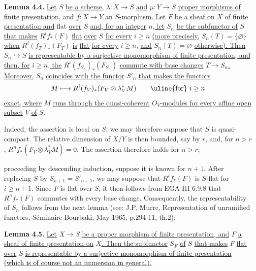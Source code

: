 \textbf{Lemma 4.4.} \uline{Let} \(S\) \uline{be a scheme,} \(\lambda:X\to S\) \uline{and} \(\mu:Y\to S\) \uline{proper morphisms of finite presentation, and} \(f:X\to Y\) \uline{an} \(S\)\uline{-morphism. Let} \(F\) \uline{be a sheaf on} \(X\) \uline{of finite presentation and} flat \uline{over} \(S\) \uline{and, for an integer} \(n\)\uline{, let} \(S_n\) \uline{be the subfunctor of} \(S\) \uline{that makes} \(R^if_*(F)\) \uline{flat} \uline{over} \(S\) \uline{for every} \(i\ge n\) \uline{(more precisely,} \(S_n(T)=\{\varnothing\}\) \uline{when} \(R^i(f_T)_*(F_T)\) \uline{is} \uline{flat} \uline{for every} \(i\ge n\), \uline{and} \(S_n(T)=\varnothing\) \uline{otherwise). Then} \(S_n\hookrightarrow S\) \uline{is representable by a surjective monomorphism of finite presentation, and then, for} \(i\ge n\)\uline{, the} \(R^i(f_{S_n})_*(F_{S_n})\) \uline{commute with base changes} \(T\to S_n\)\uline{. Moreover,} \(S_n\) \uline{coincides with the functor} \(S'_n\) \uline{that makes the functors}
\[
  M\longmapsto R^i(f_V)_*(F_V\otimes\lambda_V^*M)\qquad \text{\uline{for} } i\ge n
\]
\uline{exact, where} \(M\) \uline{runs through the quasi-coherent} \({O}_V\)\uline{-modules for every affine open subset} \(V\) \uline{of} \(S\).

Indeed, the assertion is local on \(S\); we may therefore suppose that \(S\) is quasi-compact. The relative dimension of \(X/Y\) is then bounded, say by \(r\), and, for \(n>r\), \(R^nf_*(F_V\otimes\lambda_V^*M)=0\). The assertion therefore holds for \(n>r\);


%
proceeding by descending induction, suppose it is known for \(n+1\). After replacing \(S\) by \(S_{n+1}=S'_{n+1}\), we may suppose that \(R^if_*(F)\) is \(S\)-flat for \(i\ge n+1\). Since \(F\) is flat over \(S\), it then follows from EGA III 6.9.8 that \(R^nf_*(F)\) commutes with every base change. Consequently, the representability of \(S_n\) follows from the next lemma (see: J.P. Murre, Representation of unramified functors, Séminaire Bourbaki; May 1965, p.294-11, th.2):

\textbf{Lemma 4.5.} \uline{Let} \(X\to S\) \uline{be a proper morphism of finite presentation, and} \(F\) \uline{a sheaf of finite presentation on} \(X\)\uline{. Then the subfunctor} \(S_F\) \uline{of} \(S\) \uline{that makes} \(F\) \uline{flat over} \(S\) \uline{is representable by a surjective monomorphism of finite presentation (which is of course not an immersion in general).}

